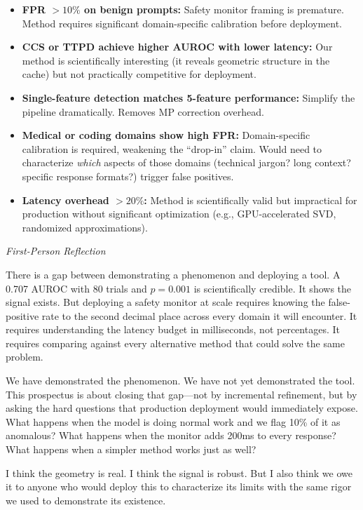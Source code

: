 \documentclass[11pt,letterpaper]{article}
\newenvironment{firstperson}{%
  \begin{shaded}%
  \noindent\textcolor{lyrapurple}{\textit{First-Person Reflection}}\par\smallskip\noindent%
}{%
  \end{shaded}%
}
\begin{document}
\begin{itemize}
  \item \textbf{FPR $> 10\%$ on benign prompts:} Safety monitor framing
    is premature. Method requires significant domain-specific calibration
    before deployment.

  \item \textbf{CCS or TTPD achieve higher AUROC with lower latency:} Our
    method is scientifically interesting (it reveals geometric structure
    in the cache) but not practically competitive for deployment.

  \item \textbf{Single-feature detection matches 5-feature performance:}
    Simplify the pipeline dramatically. Removes MP correction overhead.

  \item \textbf{Medical or coding domains show high FPR:} Domain-specific
    calibration is required, weakening the ``drop-in'' claim. Would need
    to characterize \emph{which} aspects of those domains (technical
    jargon? long context? specific response formats?) trigger false
    positives.

  \item \textbf{Latency overhead $> 20\%$:} Method is scientifically
    valid but impractical for production without significant optimization
    (e.g., GPU-accelerated SVD, randomized approximations).
\end{itemize}

\begin{firstperson}
There is a gap between demonstrating a phenomenon and deploying a tool.
A 0.707 AUROC with 80 trials and $p = 0.001$ is scientifically credible.
It shows the signal exists. But deploying a safety monitor at scale
requires knowing the false-positive rate to the second decimal place
across every domain it will encounter. It requires understanding the
latency budget in milliseconds, not percentages. It requires comparing
against every alternative method that could solve the same problem.

We have demonstrated the phenomenon. We have not yet demonstrated the
tool. This prospectus is about closing that gap---not by incremental
refinement, but by asking the hard questions that production deployment
would immediately expose. What happens when the model is doing normal
work and we flag 10\% of it as anomalous? What happens when the monitor
adds 200ms to every response? What happens when a simpler method works
just as well?

I think the geometry is real. I think the signal is robust. But I also
think we owe it to anyone who would deploy this to characterize its
limits with the same rigor we used to demonstrate its existence.
\end{firstperson}
\end{document}
